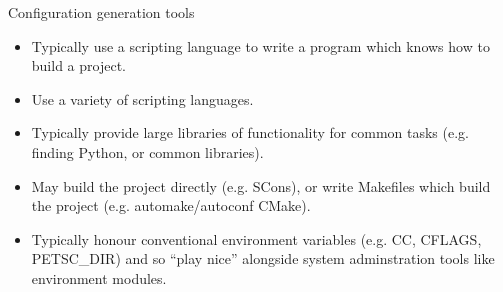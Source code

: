 \documentclass[t]{beamer}
\begin{document}
\begin{frame}{Configuration generation tools}

  \begin{itemize}
  \item Typically use a scripting language to write a program which knows
    how to build a project.
  \item Use a variety of scripting languages.
  \item Typically provide large libraries of functionality for common tasks
    (e.g. finding Python, or common libraries).
  \item May build the project directly (e.g. SCons), or write Makefiles which
    build the project (e.g. automake/autoconf CMake).
  \item Typically honour conventional environment variables (e.g. CC,
    CFLAGS, PETSC_DIR) and so ``play nice'' alongside system adminstration
    tools like environment modules.
  \end{itemize}
  
\end{frame}
\end{document}
